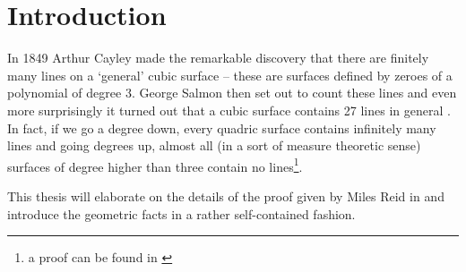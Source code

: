 \section{Introduction}

In 1849 Arthur Cayley made the remarkable discovery that there are finitely many lines on a `general' cubic surface -- these are surfaces defined by zeroes of a polynomial of degree 3.
George Salmon then set out to count these lines and even more surprisingly it turned out that a cubic surface contains 27 lines in general \cite[p. 496]{salmon1882treatise}.
In fact, if we go a degree down, every quadric surface contains infinitely many lines and going degrees up, almost all (in a sort of measure theoretic sense) surfaces of degree higher than three contain no lines\footnote{a proof can be found in \cite[theorem 1.27]{shafarevich1994basic}}.

This thesis will elaborate on the details of the proof given by Miles Reid in \cite[§7]{reid1988undergraduate} and introduce the geometric facts in a rather self-contained fashion.
